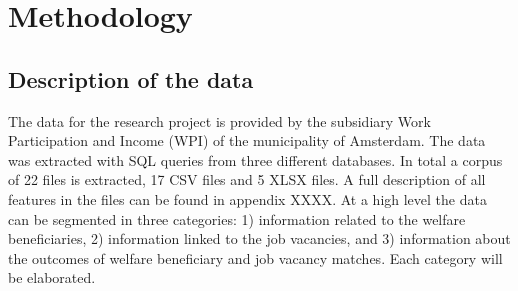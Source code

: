 \section{Methodology}
\label{sec:meth}


\subsection{Description of the data}

The data for the research project is provided by the subsidiary Work Participation and Income (WPI) of the municipality of Amsterdam. The data was extracted with SQL queries from three different databases. In total a corpus of 22 files is extracted, 17 CSV files and 5 XLSX files. A full description of all features in the files can be found in appendix XXXX. At a high level the data can be segmented in three categories: 1) information related to the welfare beneficiaries, 2) information linked to the job vacancies, and 3) information about the outcomes of welfare beneficiary and job vacancy matches. Each category will be elaborated.

